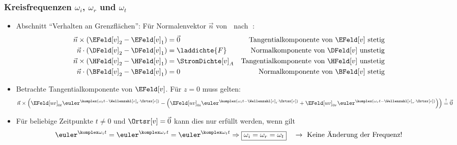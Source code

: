 \begin{frame}
  \frametitle{Kreisfrequenzen \(\omega_i\), \(\omega_r\) und \(\omega_t\)}
  \begin{itemize}[<+->]
  \item Abschnitt \enquote{Verhalten an Grenzflächen}: Für Normalenvektor \(\vec{n}\) \alert{von {\larger\textcircled{}} nach {\larger\textcircled{}}}:
    \begin{align*}
      \vec{n} \times \left(\EFeld[v]_2 - \EFeld[v]_1 \right) &=\vec{0} &\text{Tangentialkomponente von \(\EFeld[v]\) stetig}\\
      \vec{n} \cdot \left(\DFeld[v]_2 - \DFeld[v]_1 \right) &=\laddichte{F} &\text{Normalkomponente von \(\DFeld[v]\) unstetig}\\
      \vec{n} \times \left(\HFeld[v]_2 - \HFeld[v]_1 \right) &=\StromDichte[v]_{A} &\text{Tangentialkomponente von \(\HFeld[v]\) unstetig}\\
      \vec{n} \cdot \left(\BFeld[v]_2 - \BFeld[v]_1 \right) &=0 &\text{Normalkomponente von \(\BFeld[v]\) stetig}
    \end{align*}
  \item Betrachte Tangentialkomponente von \(\EFeld[v]\). Für \(z=0\) muss gelten:
    \begin{equation*}
      \vec{n} \times \left( \EFeld[uv]_{0t} \euler^{\komplex(\omega_t t - \Wellenzahl[v]_t \cdot \Ortsr[v])} -\left( \EFeld[uv]_{0i} \euler^{\komplex(\omega_i t - \Wellenzahl[v]_i \cdot \Ortsr[v])} + \EFeld[uv]_{0r} \euler^{\komplex(\omega_r t - \Wellenzahl[v]_r \cdot \Ortsr[v])}\right)\right) \stackrel{!}{=} \vec{0}
    \end{equation*}
  \item Für \alert{beliebige Zeitpunkte \(t \ne 0\) und \(\Ortsr[v] = \vec{0}\)} kann dies nur erfüllt werden, wenn gilt
    \begin{equation*}
      \euler^{\komplex\omega_i t} = \euler^{\komplex\omega_r t} =\euler^{\komplex\omega_t t} \Rightarrow \boxed{\omega_i =\omega_r = \omega_t} \quad \to\text{ Keine Änderung der Frequenz!}
      \end{equation*}
  \end{itemize}
\end{frame}

